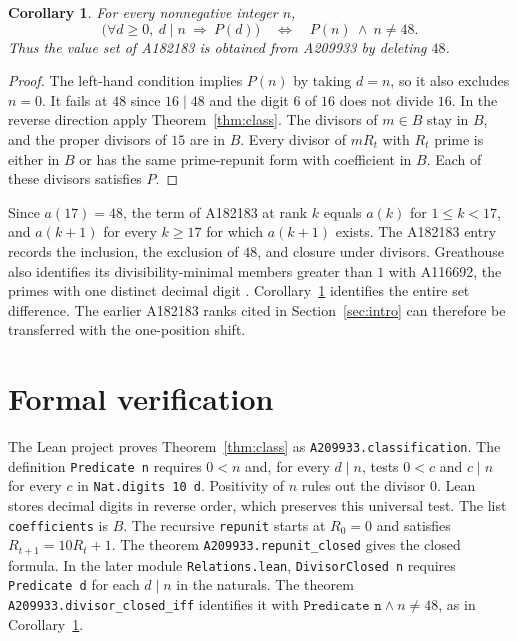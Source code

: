 \documentclass[11pt]{article}
\newtheorem{corollary}[theorem]{Corollary}
\begin{document}
\begin{corollary}\label{cor:relation}
For every nonnegative integer \(n\),
\[
 \bigl(\forall d\ge0,\ d\mid n\ \Longrightarrow\ P(d)\bigr)
 \quad\Longleftrightarrow\quad
 P(n)\ \land\ n\ne48 .
\]
Thus the value set of A182183 is obtained from A209933 by deleting \(48\).
\end{corollary}

\begin{proof}
The left-hand condition implies \(P(n)\) by taking \(d=n\), so it
also excludes \(n=0\). It fails at \(48\) since \(16\mid48\) and the
digit \(6\) of \(16\) does not divide \(16\). In the reverse
direction apply Theorem~\ref{thm:class}. The divisors of \(m\in B\)
stay in \(B\), and the proper divisors of \(15\) are in \(B\).
Every divisor of \(mR_t\) with \(R_t\) prime is either in \(B\) or has
the same prime-repunit form with coefficient in \(B\). Each of these
divisors satisfies \(P\).
\end{proof}

Since \(a(17)=48\), the term of A182183 at rank \(k\) equals \(a(k)\)
for \(1\le k<17\), and \(a(k+1)\) for every \(k\ge17\) for which
\(a(k+1)\) exists. The A182183 entry records the inclusion, the
exclusion of \(48\), and closure under divisors. Greathouse also
identifies its divisibility-minimal members greater than \(1\) with
A116692, the primes with one distinct decimal digit
\cite{oeis182183,oeis116692}. Corollary~\ref{cor:relation} identifies
the entire set difference. The earlier A182183 ranks cited in
Section~\ref{sec:intro} can therefore be transferred with the
one-position shift.

\section{Formal verification}

The Lean project \cite{project} proves Theorem~\ref{thm:class} as
\texttt{A209933.classification}. The definition \texttt{Predicate n}
requires \(0<n\) and, for every \(d\mid n\), tests \(0<c\) and \(c\mid n\)
for every \(c\) in \texttt{Nat.digits 10 d}. Positivity of \(n\) rules
out the divisor \(0\). Lean stores decimal digits in reverse order,
which preserves this universal test. The list \texttt{coefficients}
is \(B\). The recursive \texttt{repunit} starts at \(R_0=0\) and
satisfies \(R_{t+1}=10R_t+1\).
The theorem \texttt{A209933.repunit\_closed} gives the closed formula.
In the later module \texttt{Relations.lean}, \texttt{DivisorClosed n}
requires \texttt{Predicate d} for each \(d\mid n\) in the naturals.
The theorem \texttt{A209933.divisor\_closed\_iff} identifies it with
\(\texttt{Predicate n}\land n\ne48\), as in Corollary~\ref{cor:relation}.
\end{document}
